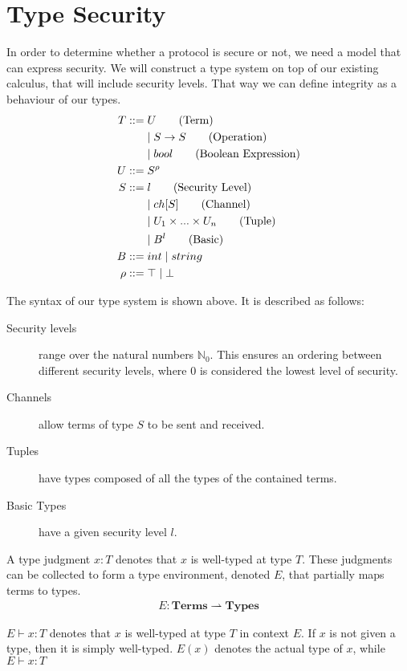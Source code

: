\section{Type Security}
In order to determine whether a protocol is secure or not, we need a model that can express security.
We will construct a type system on top of our existing calculus, that will include security levels.
That way we can define integrity as a behaviour of our types.
\begin{align*}
	T::=&\;U \tag{Term}\\
	&\mid S\rightarrow S \tag{Operation}\\
	&\mid bool \tag{Boolean Expression}\\
	U::=&\;S^\rho\\
	S::=&\;l \tag{Security Level}\\
	&\mid ch[S] \tag{Channel}\\
	&\mid U_1 \times...\times U_n \tag{Tuple}\\
	&\mid B^l \tag{Basic}\\
	B::=&\;int 
	\mid string\\
	\rho::=&\;\top\mid\bot\\
\end{align*}

\noindent The syntax of our type system is shown above. It is described as follows:

\begin{description}
\item[Security levels] range over the natural numbers $\mathbb{N}_0$. This ensures an ordering between different security levels, where $0$ is considered the lowest level of security.
\item[Channels] allow terms of type $S$ to be sent and received.
\item[Tuples] have types composed of all the types of the contained terms.
\item[Basic Types] have a given security level $l$.
\end{description}

\noindent A type judgment $x:T$ denotes that $x$ is well-typed at type $T$.
These judgments can be collected to form a type environment, denoted $E$, that partially maps terms to types.
\begin{align*}
E: \mathbf{Terms} \rightharpoonup \mathbf{Types}
\end{align*}

\noindent $E\vdash x:T$ denotes that $x$ is well-typed at type $T$ in context $E$.
If $x$ is not given a type, then it is simply well-typed. $E(x)$ denotes the actual type of $x$, while $E\vdash x:T$ 

